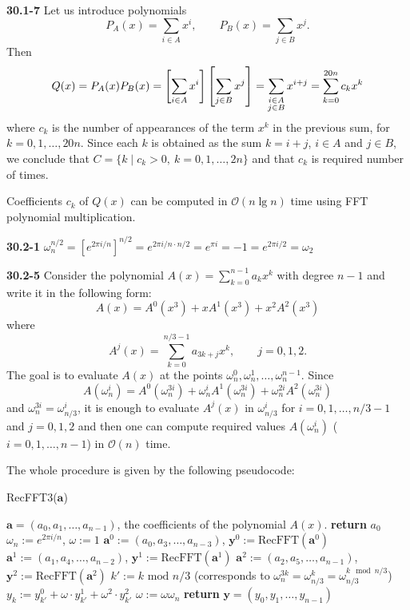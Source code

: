 \documentclass[12pt]{amsart}
\numberwithin{equation}{section}
\renewcommand{\(}{\left(}
\renewcommand{\)}{\right)}
\renewcommand{\[}{\left[}
\renewcommand{\]}{\right]}
\begin{document}
\noindent \textbf{30.1-7} Let us introduce polynomials
$$
P_A(x) = \sum_{i \in A} x^i, \qquad P_B(x) = \sum_{j \in B} x^j.
$$
Then
$$
Q(x) = P_A(x)P_B(x) = \[ \sum_{i \in A} x^i \] \[ \sum_{j \in B} x^j \] = \sum_{\begin{subarray}{c} i \in A\\ j \in B \end{subarray}} x^{i+j}
 = \sum_{k=0}^{20n} c_k x^k
$$
where $c_k$ is the number of appearances of the term $x^k$ in the previous sum, for $k=0,1,\ldots,20n$. Since each $k$ is obtained as the sum $k=i+j$, $i\in A$ and $j\in B$, we conclude that $C = \{k \mid c_k>0,\ k=0,1,\ldots,2n\}$ and that $c_k$ is required number of times.

\medskip

Coefficients $c_k$ of $Q(x)$ can be computed in $\mathcal{O}(n \lg n)$ time using FFT polynomial multiplication.

\bigskip

\noindent \textbf{30.2-1} $\omega_n^{n/2} = \[e^{2\pi i/n}\]^{n/2} = e^{2\pi i/n \cdot n/2} = e^{\pi i} = -1 = e^{2\pi i/2} = \omega_2$

\bigskip

\noindent \textbf{30.2-5} Consider the polynomial $A(x)=\sum_{k=0}^{n-1}a_kx^k$ with degree $n-1$ and write it in the following form:
$$
A(x) = A^0(x^3) + xA^1(x^3) + x^2A^2(x^3)
$$
where
$$
A^j(x) = \sum_{k=0}^{n/3-1} a_{3k+j}x^k, \qquad j=0,1,2.
$$
The goal is to evaluate $A(x)$ at the points $\omega_n^0, \omega_n^1, \ldots,\omega_n^{n-1}$. Since
$$
A(\omega_n^i) = A^0(\omega_n^{3i}) + \omega_n^iA^1(\omega_n^{3i}) + \omega_n^{2i}A^2(\omega_n^{3i})
$$
and $\omega_n^{3i}=\omega_{n/3}^i$, it is enough to evaluate $A^j(x)$ in $\omega_{n/3}^i$ for $i=0,1,\ldots,n/3-1$ and $j=0,1,2$ and then one can compute required values $A(\omega_n^i)$ ($i=0,1,\ldots,n-1$) in $\mathcal{O}(n)$ time.

The whole procedure is given by the following pseudocode:

\begin{algorithm}[H]
\caption{RecFFT3($\mathbf{a}$)}
\begin{algorithmic}[1]
\REQUIRE $\mathbf{a} = (a_0,a_1,\ldots,a_{n-1})$, the coefficients of the polynomial $A(x)$.
\STATE \textbf{return} $a_0$
\ENDIF
\STATE $\omega_n := e^{2\pi i/n}$, \quad $\omega := 1$
\STATE $\mathbf{a}^0 := (a_0, a_3, \ldots, a_{n-3})$, \quad $\mathbf{y}^0 := \mathrm{RecFFT}(\mathbf{a}^0)$
\STATE $\mathbf{a}^1 := (a_1, a_4, \ldots, a_{n-2})$, \quad $\mathbf{y}^1 := \mathrm{RecFFT}(\mathbf{a}^1)$
\STATE $\mathbf{a}^2 := (a_2, a_5, \ldots, a_{n-1})$, \quad $\mathbf{y}^2 := \mathrm{RecFFT}(\mathbf{a}^2)$
\STATE    $k' := k \textrm{ mod } n/3 $  \qquad (corresponds to $\omega_n^{3k} = \omega_{n/3}^k = \omega_{n/3}^{k \mod n/3}$)
\STATE    $y_k := y^0_{k'} + \omega \cdot y^1_{k'} + \omega^2 \cdot y^2_{k'}$
\STATE    $\omega := \omega \omega_n$
\ENDFOR
\STATE \textbf{return} $\mathbf{y} = (y_0, y_1, \ldots, y_{n-1})$
\end{algorithmic}
\end{algorithm}
\end{document}
